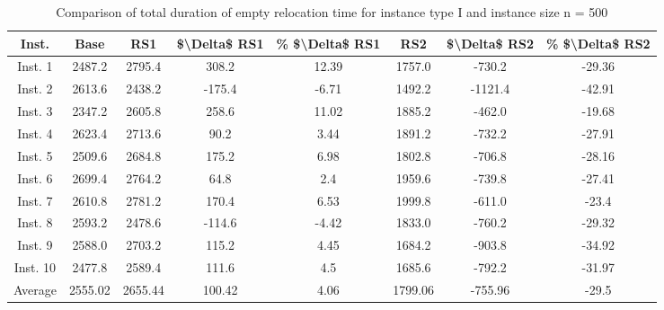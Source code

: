 \begin{table}[H]
\centering
\begin{tabular}{cccccccc}
  \hline
  \textbf{Inst.} & \textbf{Base} & \textbf{RS1} & \textbf{\$\textbackslash{}Delta\$  RS1} & \textbf{\% \$\textbackslash{}Delta\$  RS1} & \textbf{RS2} & \textbf{\$\textbackslash{}Delta\$  RS2} & \textbf{\% \$\textbackslash{}Delta\$  RS2} \\\hline
  Inst. 1 & 2487.2 & 2795.4 & 308.2 & 12.39 & 1757.0 & -730.2 & -29.36 \\
  Inst. 2 & 2613.6 & 2438.2 & -175.4 & -6.71 & 1492.2 & -1121.4 & -42.91 \\
  Inst. 3 & 2347.2 & 2605.8 & 258.6 & 11.02 & 1885.2 & -462.0 & -19.68 \\
  Inst. 4 & 2623.4 & 2713.6 & 90.2 & 3.44 & 1891.2 & -732.2 & -27.91 \\
  Inst. 5 & 2509.6 & 2684.8 & 175.2 & 6.98 & 1802.8 & -706.8 & -28.16 \\
  Inst. 6 & 2699.4 & 2764.2 & 64.8 & 2.4 & 1959.6 & -739.8 & -27.41 \\
  Inst. 7 & 2610.8 & 2781.2 & 170.4 & 6.53 & 1999.8 & -611.0 & -23.4 \\
  Inst. 8 & 2593.2 & 2478.6 & -114.6 & -4.42 & 1833.0 & -760.2 & -29.32 \\
  Inst. 9 & 2588.0 & 2703.2 & 115.2 & 4.45 & 1684.2 & -903.8 & -34.92 \\
  Inst. 10 & 2477.8 & 2589.4 & 111.6 & 4.5 & 1685.6 & -792.2 & -31.97 \\
  Average & 2555.02 & 2655.44 & 100.42 & 4.06 & 1799.06 & -755.96 & -29.5 \\\hline
\end{tabular}
\caption{Comparison of total duration of empty relocation time for instance type I and instance size n = 500}
\label{tab:wait:resrelocation-empty-relocation-comparison_I_500}
\end{table}
